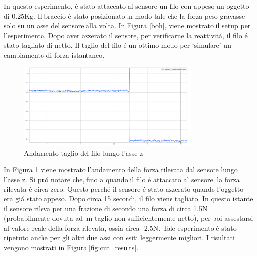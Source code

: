 In questo esperimento, \'{e} stato attaccato al sensore un filo con appeso un oggetto di 0.25Kg. 
Il braccio \'{e} stato posizionato in modo tale che la forza peso gravasse solo su un asse del sensore alla volta. 
In Figura \ref{boh}, viene mostrato il setup per l'esperimento.
Dopo aver azzerato il sensore, per verificarne la reattivit\'{a}, il filo \'{e} stato tagliato di netto. 
Il taglio del filo \'{e} un ottimo modo per `simulare' un cambiamento di forza istantaneo.
\begin{figure}[H]
    \centering
    \includegraphics*[width=0.80\textwidth]{images/z_cut.png}
    \caption{Andamento taglio del filo lungo l'asse z}
    \label{fig:z_cut}
\end{figure}
In Figura \ref{fig:z_cut} viene mostrato l'andamento della forza rilevata dal sensore lungo l'asse z. 
Si pu\'{o} notare che, fino a quando il filo \'{e} attaccato al sensore, la forza rilevata \'{e} circa zero. 
Questo perch\'{e} il sensore \'{e} stato azzerato quando l'oggetto era gi\'{a} stato appeso. 
Dopo circa 15 secondi, il filo viene tagliato. In questo istante il sensore rileva per una frazione di secondo una forza di circa 1.5N 
(probabilmente dovuta ad un taglio non sufficientemente netto), per poi assestarsi al valore reale della forza rilevata, 
ossia circa -2.5N. 
Tale esperimento \'{e} stato ripetuto anche per gli altri due assi con esiti leggermente migliori. 
I risultati vengono mostrati in Figura \ref{fig:cut_results}.
